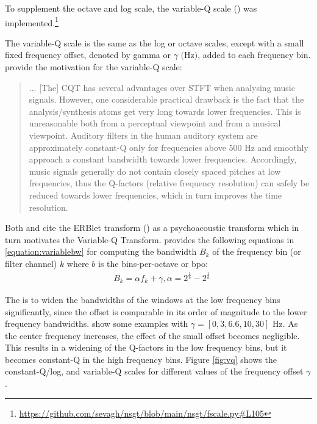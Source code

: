 \documentclass[report.tex]{subfiles}
\begin{document}
To supplement the octave and log scale, the variable-Q scale (\cite{variableq1, variableq2}) was implemented.\footnote{\url{https://github.com/sevagh/nsgt/blob/main/nsgt/fscale.py\#L105}}

The variable-Q scale is the same as the log or octave scales, except with a small fixed frequency offset, denoted by gamma or $\gamma \text{ (Hz)}$, added to each frequency bin. \textcite{variableq1} provide the motivation for the variable-Q scale:
\begin{quote}
	... [The] CQT has several advantages over STFT when analysing music signals. However, one considerable practical drawback is the fact that the analysis/synthesis atoms get very long towards lower frequencies. This is unreasonable both from a perceptual viewpoint and from a musical viewpoint. Auditory filters in the human auditory system are approximately constant-Q only for frequencies above 500 Hz and smoothly approach a constant bandwidth towards lower frequencies. Accordingly, music signals generally do not contain closely spaced pitches at low frequencies, thus the Q-factors (relative frequency resolution) can safely be reduced towards lower frequencies, which in turn improves the time resolution.
\end{quote}

Both \textcite{variableq1} and \textcite{variableq2} cite the ERBlet transform (\cite{erblet}) as a psychoacoustic transform which in turn motivates the Variable-Q Transform. \textcite{variableq1, variableq2} provides the following equations in \ref{equation:variablebw} for computing the bandwidth $B_{k}$ of the frequency bin (or filter channel) $k$ where $b$ is the bins-per-octave or bpo:
\begin{align}\tag{5}\label{equation:variablebw}
	\nonumber & B_{k} = \alpha f_{k} + \gamma, \alpha = 2^{\frac{1}{b}} - 2^{\frac{1}{b}}
\end{align}

The is to widen the bandwidths of the windows at the low frequency bins significantly, since the offset is comparable in its order of magnitude to the lower frequency bandwidths. \textcite{variableq1} show some examples with $\gamma = [0, 3, 6.6, 10, 30] \text{ Hz}$. As the center frequency increases, the effect of the small offset becomes negligible. This results in a widening of the Q-factors in the low frequency bins, but it becomes constant-Q in the high frequency bins. Figure \ref{fig:vq} shows the constant-Q/log, and variable-Q scales for different values of the frequency offset $\gamma$.
\end{document}
